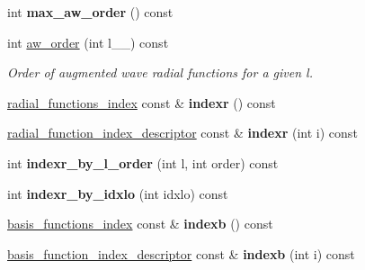\begin{DoxyCompactItemize}
\item 
\hypertarget{classsirius_1_1_atom__type_a8704260cdf9b6ac1608c784b07ff1c40}{}int {\bfseries max\+\_\+aw\+\_\+order} () const \label{classsirius_1_1_atom__type_a8704260cdf9b6ac1608c784b07ff1c40}

\item 
int \hyperlink{classsirius_1_1_atom__type_a44624791b05453a15fe5c5dc074ee4b3}{aw\+\_\+order} (int l\+\_\+\+\_\+) const 
\begin{DoxyCompactList}\small\item\em Order of augmented wave radial functions for a given l. \end{DoxyCompactList}\item 
\hypertarget{classsirius_1_1_atom__type_a11942999c4c151a9fd40a20e73344310}{}\hyperlink{classsirius_1_1radial__functions__index}{radial\+\_\+functions\+\_\+index} const \& {\bfseries indexr} () const \label{classsirius_1_1_atom__type_a11942999c4c151a9fd40a20e73344310}

\item 
\hypertarget{classsirius_1_1_atom__type_a76c30058e6db9c689609ebd26e6cdd5c}{}\hyperlink{structradial__function__index__descriptor}{radial\+\_\+function\+\_\+index\+\_\+descriptor} const \& {\bfseries indexr} (int i) const \label{classsirius_1_1_atom__type_a76c30058e6db9c689609ebd26e6cdd5c}

\item 
\hypertarget{classsirius_1_1_atom__type_a5b29fe6a859a2472ad247fdc8d35d200}{}int {\bfseries indexr\+\_\+by\+\_\+l\+\_\+order} (int l, int order) const \label{classsirius_1_1_atom__type_a5b29fe6a859a2472ad247fdc8d35d200}

\item 
\hypertarget{classsirius_1_1_atom__type_a39bc9ad89d1127ecd2c911f0441b8a17}{}int {\bfseries indexr\+\_\+by\+\_\+idxlo} (int idxlo) const \label{classsirius_1_1_atom__type_a39bc9ad89d1127ecd2c911f0441b8a17}

\item 
\hypertarget{classsirius_1_1_atom__type_a2d961eda2377ce0956f132e8d8f27070}{}\hyperlink{classsirius_1_1basis__functions__index}{basis\+\_\+functions\+\_\+index} const \& {\bfseries indexb} () const \label{classsirius_1_1_atom__type_a2d961eda2377ce0956f132e8d8f27070}

\item 
\hypertarget{classsirius_1_1_atom__type_aad5a62a9dd56c5e188f78b108ffd0e4e}{}\hyperlink{structbasis__function__index__descriptor}{basis\+\_\+function\+\_\+index\+\_\+descriptor} const \& {\bfseries indexb} (int i) const \label{classsirius_1_1_atom__type_aad5a62a9dd56c5e188f78b108ffd0e4e}


\end{DoxyCompactItemize}
